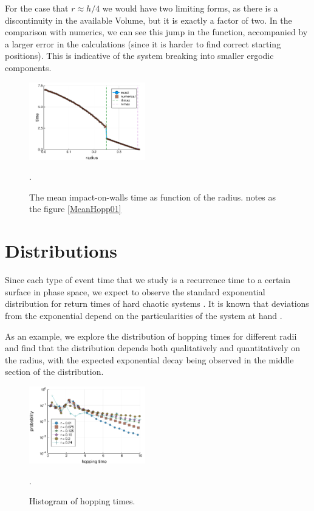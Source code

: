 \documentclass[superscriptaddress,pre,reprint,showpacs,twocolumn]{revtex4-1}
\begin{document}
For the case that $r\approx h/4$ we would have two limiting forms,
as there is a discontinuity in the available Volume, but it is exactly
a factor of two. In the comparison with numerics, we can see
this jump in the function, accompanied by a larger error in the
calculations (since it is harder to find correct starting positions). 
This is indicative of 
the system breaking into smaller ergodic components.


\begin{figure}[h]
  \centering
  \includegraphics[width=0.45\textwidth]{./figures/HitRightWall01.pdf}
  \caption{The mean impact-on-walls time as function of the radius. 
    notes as the figure \ref{MeanHopp01}}
    \label{MeanImp01}.
\end{figure}



%
\section{Distributions}

Since each type of event time that we study is a recurrence time to a
certain surface in phase space, we expect to observe the standard
exponential distribution for return times of hard chaotic systems
\cite{Hirata1999}. It is known that deviations from the
exponential depend on the particularities of the system at hand
\cite{Altmann2005}.


As an example, we explore
the distribution of hopping times for different radii and find that the
distribution depends both qualitatively and quantitatively on the
radius, with the expected exponential decay being observed in the middle section
of the distribution. 


\begin{figure}[h]
  \centering
  \includegraphics[width=0.45\textwidth]{figures/histogram_hopping_times.pdf}
  \caption{Histogram of hopping times.}
    \label{histogram_hopping}.
\end{figure}
\end{document}
